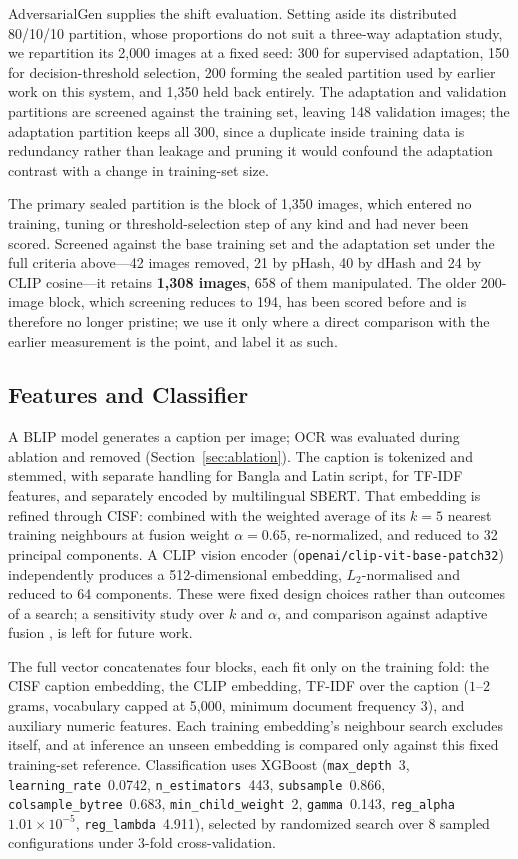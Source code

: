 \documentclass[pdflatex,sn-mathphys-num]{sn-jnl}
\begin{document}
AdversarialGen supplies the shift evaluation. Setting aside its distributed
80/10/10 partition, whose proportions do not suit a three-way adaptation study,
we repartition its 2{,}000 images at a fixed seed: 300 for supervised
adaptation, 150 for decision-threshold selection, 200 forming the sealed
partition used by earlier work on this system, and 1{,}350 held back entirely.
The adaptation and validation partitions are screened against the training set,
leaving 148 validation images; the adaptation partition keeps all 300, since a
duplicate inside training data is redundancy rather than leakage and pruning it
would confound the adaptation contrast with a change in training-set size.

The primary sealed partition is the block of 1{,}350 images, which entered no
training, tuning or threshold-selection step of any kind and had never been
scored. Screened against the base training set and the adaptation set under the
full criteria above---42 images removed, 21 by pHash, 40 by dHash and 24 by
CLIP cosine---it retains \textbf{1{,}308 images}, 658 of them manipulated. The
older 200-image block, which screening reduces to 194, has been scored before
and is therefore no longer pristine; we use it only where a direct comparison
with the earlier measurement is the point, and label it as such.

\subsection{Features and Classifier}
\label{sec:features}

A BLIP model generates a caption per image; OCR was evaluated during ablation
and removed (Section~\ref{sec:ablation}). The caption is tokenized and stemmed,
with separate handling for Bangla and Latin script, for TF-IDF features, and
separately encoded by multilingual SBERT. That embedding is refined through
CISF: combined with the weighted average of its $k=5$ nearest training
neighbours at fusion weight $\alpha=0.65$, re-normalized, and reduced to 32
principal components. A CLIP vision encoder
(\texttt{openai/clip-vit-base-patch32}) independently produces a
512-dimensional embedding, $L_2$-normalised and reduced to 64 components. These
were fixed design choices rather than outcomes of a search; a sensitivity study
over $k$ and $\alpha$, and comparison against adaptive fusion
\cite{mmfusionnet,claaf}, is left for future work.

The full vector concatenates four blocks, each fit only on the training fold:
the CISF caption embedding, the CLIP embedding, TF-IDF over the caption
($1$--$2$ grams, vocabulary capped at 5{,}000, minimum document frequency 3),
and auxiliary numeric features. Each training embedding's neighbour search
excludes itself, and at inference an unseen embedding is compared only against
this fixed training-set reference. Classification uses XGBoost
(\texttt{max\_depth}~3, \texttt{learning\_rate}~0.0742,
\texttt{n\_estimators}~443, \texttt{subsample}~0.866,
\texttt{colsample\_bytree}~0.683, \texttt{min\_child\_weight}~2,
\texttt{gamma}~0.143, \texttt{reg\_alpha}~$1.01\times10^{-5}$,
\texttt{reg\_lambda}~4.911), selected by randomized search over 8 sampled
configurations under 3-fold cross-validation.
\end{document}
